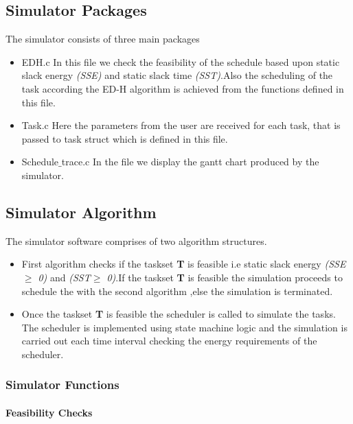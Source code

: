 \documentclass[12pt,hidelinks]{article}
\begin{document}
{\subsection{Simulator Packages}
The simulator consists of three main packages 
\begin{itemize}
    \item EDH.c\newline
     In this file we check the feasibility of the schedule  based upon static slack energy \textit{(SSE)} and static slack time \textit{(SST)}.Also the scheduling of the task according the ED-H algorithm is achieved from the functions defined in this file.
     \item Task.c\newline
     Here the parameters from the user are received  for each task, that is passed to task struct which is defined in this file.
     \item Schedule$\_$trace.c \newline
     In the file we display the gantt chart produced by the simulator.
\end{itemize}

\subsection{Simulator Algorithm}

The simulator software comprises of two algorithm structures.
\begin{itemize}
    \item First algorithm checks if the taskset \textbf{T} is feasible i.e static slack energy \textit{(SSE$\geq$ 0)} and \textit{(SST$\geq$ 0)}.If  the taskset \textbf{T} is feasible the simulation proceeds to schedule the with the second algorithm ,else  the simulation is terminated.
    \item Once the taskset \textbf{T} is feasible the scheduler is called to simulate the tasks. The scheduler is implemented using state machine logic and the simulation is carried out each time interval checking the energy requirements of the scheduler.
\end{itemize}
\subsubsection{Simulator Functions}

\paragraph{Feasibility Checks}\hfill
\newline

}
\end{document}
